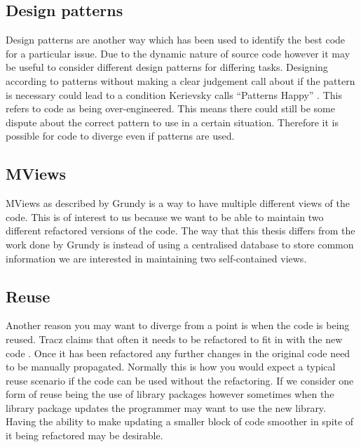 \documentclass[12pt]{CRPITStyle}
\renewcommand{\cite}{\citep}
\begin{document}
\subsection{Design patterns}
Design patterns are another way which has been used to identify the best code for a particular issue. Due to the dynamic nature of source code however it may be useful to consider different design patterns for differing tasks. Designing according to patterns without making a clear judgement call about if the pattern is necessary could lead to a condition Kerievsky calls ``Patterns Happy'' \cite{Kerievsky2004}. This refers to code as being over-engineered. This means there could still be some dispute about the correct pattern to use in a certain situation. Therefore it is possible for code to diverge even if patterns are used.
\subsection{MViews}
MViews as described by Grundy is a way to have multiple different views of the code\cite{Grundy1993}. This is of interest to us because we want to be able to maintain two different refactored versions of the code. The way that this thesis differs from the work done by Grundy is instead of using a centralised database to store common information we are interested in maintaining two self-contained views.
\subsection{Reuse}
Another reason you may want to diverge from a point is when the code is being reused. Tracz claims that often it needs to be refactored to fit in with the new code \cite{Tracz1995}. Once it has been refactored any further changes in the original code need to be manually propagated. Normally this is how you would expect a typical reuse scenario if the code can be used without the refactoring. If we consider one form of reuse being the use of library packages however sometimes when the library package updates the programmer may want to use the new library. Having the ability to make updating a smaller block of code smoother in spite of it being refactored may be desirable. 
\end{document}
